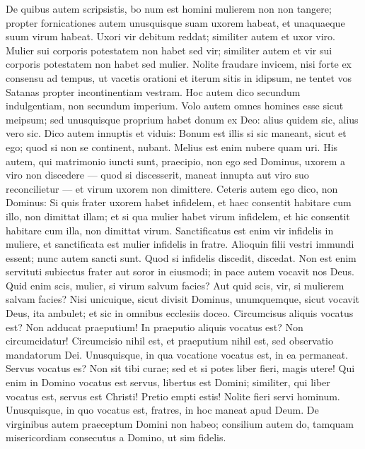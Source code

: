 \begin{biblechapter} 
\verse De quibus autem scripsistis, bo num est homini mulierem non non tangere; 
\verse propter fornicationes autem unusquisque suam uxorem habeat, et unaquaeque suum virum habeat. 
\verse Uxori vir debitum reddat; similiter autem et uxor viro. 
\verse Mulier sui corporis potestatem non habet sed vir; similiter autem et vir sui corporis potestatem non habet sed mulier. 
\verse Nolite fraudare invicem, nisi forte ex consensu ad tempus, ut vacetis orationi et iterum sitis in idipsum, ne tentet vos Satanas propter incontinentiam vestram. 
\verse Hoc autem dico secundum indulgentiam, non secundum imperium. 
\verse Volo autem omnes homines esse sicut meipsum; sed unusquisque proprium habet donum ex Deo: alius quidem sic, alius vero sic. 
\verse Dico autem innuptis et viduis: Bonum est illis si sic maneant, sicut et ego;  
\verse quod si non se continent, nubant. Melius est enim nubere quam uri. 
\verse His autem, qui matrimonio iuncti sunt, praecipio, non ego sed Dominus, uxorem a viro non discedere 
\verse — quod si discesserit, maneat innupta aut viro suo reconcilietur — et virum uxorem non dimittere. 
\verse Ceteris autem ego dico, non Dominus: Si quis frater uxorem habet infidelem, et haec consentit habitare cum illo, non dimittat illam; 
\verse et si qua mulier habet virum infidelem, et hic consentit habitare cum illa, non dimittat virum. 
\verse Sanctificatus est enim vir infidelis in muliere, et sanctificata est mulier infidelis in fratre. Alioquin filii vestri immundi essent; nunc autem sancti sunt. 
\verse Quod si infidelis discedit, discedat. Non est enim servituti subiectus frater aut soror in eiusmodi; in pace autem vocavit nos Deus. 
\verse Quid enim scis, mulier, si virum salvum facies? Aut quid scis, vir, si mulierem salvam facies? 
\verse Nisi unicuique, sicut divisit Dominus, unumquemque, sicut vocavit Deus, ita ambulet; et sic in omnibus ecclesiis doceo. 
\verse Circumcisus aliquis vocatus est? Non adducat praeputium! In praeputio aliquis vocatus est? Non circumcidatur! 
\verse Circumcisio nihil est, et praeputium nihil est, sed observatio mandatorum Dei. 
\verse Unusquisque, in qua vocatione vocatus est, in ea permaneat. 
\verse Servus vocatus es? Non sit tibi curae; sed et si potes liber fieri, magis utere! 
\verse Qui enim in Domino vocatus est servus, libertus est Domini; similiter, qui liber vocatus est, servus est Christi! 
\verse Pretio empti estis! Nolite fieri servi hominum. 
\verse Unusquisque, in quo vocatus est, fratres, in hoc maneat apud Deum. 
\verse De virginibus autem praeceptum Domini non habeo; consilium autem do, tamquam misericordiam consecutus a Domino, ut sim fidelis. 

\end{biblechapter}
